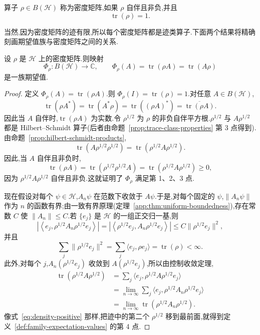 \begin{definition}[密度矩阵]\label{def:density-matrix}
算子 $\rho\in B(\mathcal H)$ 称为密度矩阵,如果 $\rho$ 自伴且非负,并且
\[
 \operatorname{tr}(\rho)=1.
\]
\end{definition}

当然,因为密度矩阵的迹有限,所以每个密度矩阵都是迹类算子.下面两个结果将精确刻画期望值族与密度矩阵之间的关系.

\begin{proposition}[密度矩阵给出期望值族]\label{prop:density-matrix-expectation}
设 $\rho$ 是 $\mathcal H$ 上的密度矩阵.则映射
\[
 \Phi_\rho:B(\mathcal H)\to\mathbb C,\qquad
 \Phi_\rho(A)=\operatorname{tr}(\rho A)=\operatorname{tr}(A\rho)
\]
是一族期望值.
\end{proposition}

\begin{proof}
定义 $\Phi_\rho(A)=\operatorname{tr}(\rho A)$.则 $\Phi_\rho(I)=\operatorname{tr}(\rho)=1$.对任意 $A\in B(\mathcal H)$,
\[
 \operatorname{tr}(\rho A^*)=\operatorname{tr}(A^*\rho)
 =\operatorname{tr}((\rho A)^*)=\overline{\operatorname{tr}(\rho A)}.
\]
因此当 $A$ 自伴时,$\operatorname{tr}(\rho A)$ 为实数.令 $\rho^{1/2}$ 为 $\rho$ 的非负自伴平方根.$\rho^{1/2}$ 与 $A\rho^{1/2}$ 都是 Hilbert--Schmidt 算子(后者由命题~\ref{prop:trace-class-properties} 第 3 点得到).由命题~\ref{prop:hilbert-schmidt-products},
\[
 \operatorname{tr}(A\rho^{1/2}\rho^{1/2})
 =\operatorname{tr}(\rho^{1/2}A\rho^{1/2}).
\]
因此,当 $A$ 自伴且非负时,
\[
 \operatorname{tr}(\rho A)
 =\operatorname{tr}(\rho^{1/2}\rho^{1/2}A)
 =\operatorname{tr}(\rho^{1/2}A\rho^{1/2})\ge0,\label{eq:density-positive}
\]
因为 $\rho^{1/2}A\rho^{1/2}$ 自伴且非负.这就证明了 $\Phi_\rho$ 满足第 1、2、3 点.

现在假设对每个 $\psi\in\mathcal H$,$A_n\psi$ 在范数下收敛于 $A\psi$.于是,对每个固定的 $\psi$,$\|A_n\psi\|$ 作为 $n$ 的函数有界;由一致有界原理(定理~\ref{app:thm:uniform-boundedness}),存在常数 $C$ 使 $\|A_n\|\le C$.若 $\{e_j\}$ 是 $\mathcal H$ 的一组正交归一基,则
\[
 \left|\left\langle e_j,\rho^{1/2}A_n\rho^{1/2}e_j\right\rangle\right|
 =\left|\left\langle\rho^{1/2}e_j,A_n\rho^{1/2}e_j\right\rangle\right|
 \le C\|\rho^{1/2}e_j\|^2,
\]
并且
\[
 \sum_j\|\rho^{1/2}e_j\|^2
 =\sum_j\langle e_j,\rho e_j\rangle
 =\operatorname{tr}(\rho)<\infty.
\]
此外,对每个 $j$,$A_n(\rho^{1/2}e_j)$ 收敛到 $A(\rho^{1/2}e_j)$,所以由控制收敛定理,
\[
\begin{aligned}
 \operatorname{tr}(\rho^{1/2}A\rho^{1/2})
 &=\sum_j\langle e_j,\rho^{1/2}A\rho^{1/2}e_j\rangle\\
 &=\lim_{n\to\infty}\sum_j\langle e_j,\rho^{1/2}A_n\rho^{1/2}e_j\rangle\\
 &=\lim_{n\to\infty}\operatorname{tr}(\rho^{1/2}A_n\rho^{1/2}).
\end{aligned}
\]
像式~\eqref{eq:density-positive} 那样,把迹中的第二个 $\rho^{1/2}$ 移到最前面,就得到定义~\ref{def:family-expectation-values} 的第 4 点.
\end{proof}

